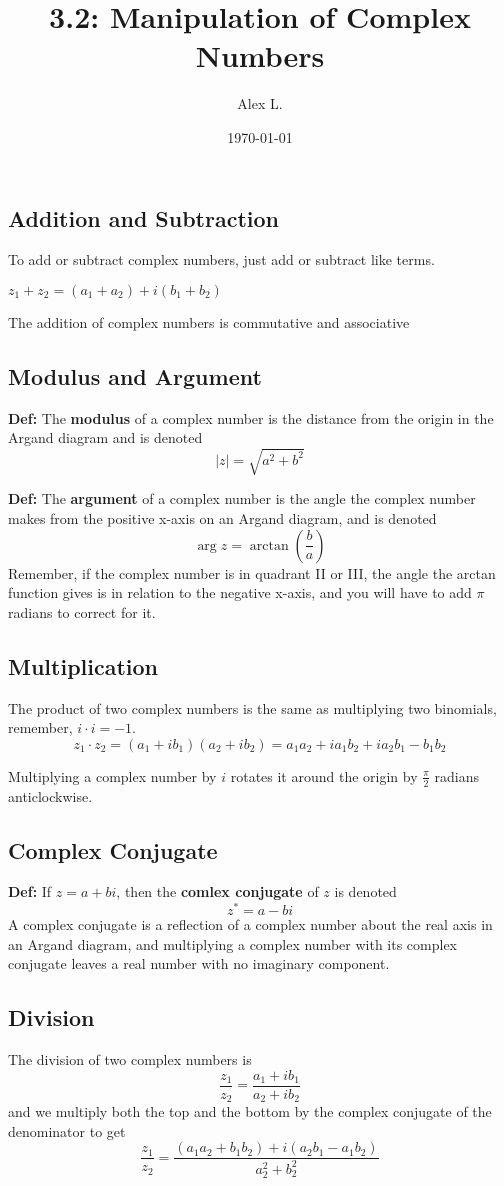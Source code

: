 \documentclass{article}
\title{3.2: Manipulation of Complex Numbers}
\author{Alex L.}
\date{\today}
\begin{document}
\maketitle

\subsection{Addition and Subtraction}

To add or subtract complex numbers, just add or subtract like terms.

$z_1 + z_2 = (a_1 + a_2) + i(b_1 + b_2)$

The addition of complex numbers is commutative and associative

\subsection{Modulus and Argument}

\textbf{Def:} The \textbf{modulus} of a complex number is the distance from the origin in the Argand diagram and is denoted $$\vert z \vert = \sqrt{a^2 + b^2}$$

\textbf{Def:} The \textbf{argument} of a complex number is the angle the complex number makes from the positive x-axis on an Argand diagram, and is denoted $$\arg z = \arctan(\frac{b}{a})$$Remember, if the complex number is in quadrant II or III, the angle the arctan function gives is in relation to the negative x-axis, and you will have to add $\pi$ radians to correct for it.

\subsection{Multiplication}

The product of two complex numbers is the same as multiplying two binomials, remember, $i \cdot i = -1$. $$z_1 \cdot z_2 = (a_1 + ib_1)(a_2 + ib_2) = a_1a_2 + ia_1b_2 + ia_2b_1 - b_1b_2$$

Multiplying a complex number by $i$ rotates it around the origin by $\frac{\pi}{2}$ radians anticlockwise.

\subsection{Complex Conjugate}

\textbf{Def:} If $z = a + bi$, then the \textbf{comlex conjugate} of $z$ is denoted $$z^* = a - bi$$A complex conjugate is a reflection of a complex number about the real axis in an Argand diagram, and multiplying a complex number with its complex conjugate leaves a real number with no imaginary component.

\subsection{Division}

The division of two complex numbers is $$\frac{z_1}{z_2} = \frac{a_1 + ib_1}{a_2 + ib_2}$$and we multiply both the top and the bottom by the complex conjugate of the denominator to get $$\frac{z_1}{z_2} = \frac{(a_1a_2 + b_1b_2) + i(a_2b_1 - a_1b_2)}{a_2^2 + b_2^2}$$
\end{document}
